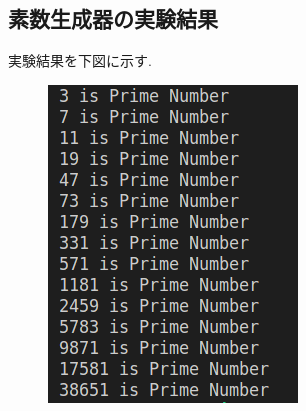 \documentclass[xelatex, 11pt, a4paper, ja=standard]{bxjsarticle}
\begin{document}
\subsection{素数生成器の実験結果}
実験結果を下図に示す. 
\begin{figure}[htbp]
    \centering
    \begin{minipage}[b]{0.4\textwidth}
        \includegraphics[width=\textwidth]{./image/primeGenerator_1.png}
        \label{fig:./image/primeGenerator_1.png}
    \end{minipage}
    \hfill
    \begin{minipage}[b]{0.4\textwidth}

\end{minipage}
\end{figure}
\end{document}
